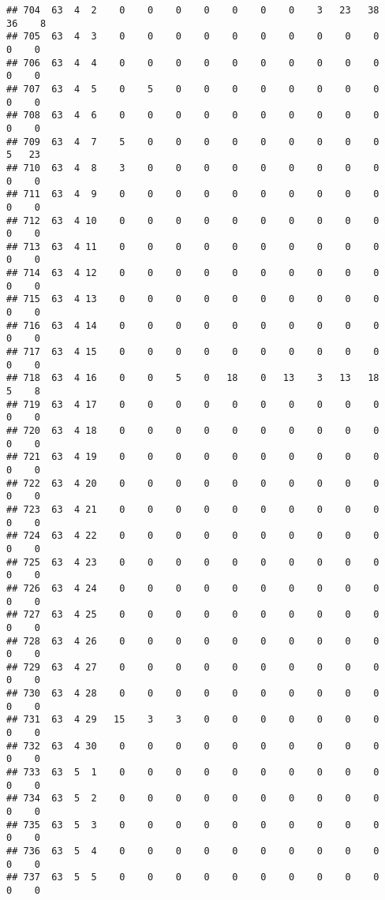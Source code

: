 \documentclass[]{article}
\begin{document}
\begin{verbatim}
## 704  63  4  2    0    0    0    0    0    0    0    3   23   38   36    8
## 705  63  4  3    0    0    0    0    0    0    0    0    0    0    0    0
## 706  63  4  4    0    0    0    0    0    0    0    0    0    0    0    0
## 707  63  4  5    0    5    0    0    0    0    0    0    0    0    0    0
## 708  63  4  6    0    0    0    0    0    0    0    0    0    0    0    0
## 709  63  4  7    5    0    0    0    0    0    0    0    0    0    5   23
## 710  63  4  8    3    0    0    0    0    0    0    0    0    0    0    0
## 711  63  4  9    0    0    0    0    0    0    0    0    0    0    0    0
## 712  63  4 10    0    0    0    0    0    0    0    0    0    0    0    0
## 713  63  4 11    0    0    0    0    0    0    0    0    0    0    0    0
## 714  63  4 12    0    0    0    0    0    0    0    0    0    0    0    0
## 715  63  4 13    0    0    0    0    0    0    0    0    0    0    0    0
## 716  63  4 14    0    0    0    0    0    0    0    0    0    0    0    0
## 717  63  4 15    0    0    0    0    0    0    0    0    0    0    0    0
## 718  63  4 16    0    0    5    0   18    0   13    3   13   18    5    8
## 719  63  4 17    0    0    0    0    0    0    0    0    0    0    0    0
## 720  63  4 18    0    0    0    0    0    0    0    0    0    0    0    0
## 721  63  4 19    0    0    0    0    0    0    0    0    0    0    0    0
## 722  63  4 20    0    0    0    0    0    0    0    0    0    0    0    0
## 723  63  4 21    0    0    0    0    0    0    0    0    0    0    0    0
## 724  63  4 22    0    0    0    0    0    0    0    0    0    0    0    0
## 725  63  4 23    0    0    0    0    0    0    0    0    0    0    0    0
## 726  63  4 24    0    0    0    0    0    0    0    0    0    0    0    0
## 727  63  4 25    0    0    0    0    0    0    0    0    0    0    0    0
## 728  63  4 26    0    0    0    0    0    0    0    0    0    0    0    0
## 729  63  4 27    0    0    0    0    0    0    0    0    0    0    0    0
## 730  63  4 28    0    0    0    0    0    0    0    0    0    0    0    0
## 731  63  4 29   15    3    3    0    0    0    0    0    0    0    0    0
## 732  63  4 30    0    0    0    0    0    0    0    0    0    0    0    0
## 733  63  5  1    0    0    0    0    0    0    0    0    0    0    0    0
## 734  63  5  2    0    0    0    0    0    0    0    0    0    0    0    0
## 735  63  5  3    0    0    0    0    0    0    0    0    0    0    0    0
## 736  63  5  4    0    0    0    0    0    0    0    0    0    0    0    0
## 737  63  5  5    0    0    0    0    0    0    0    0    0    0    0    0

\end{verbatim}
\end{document}
